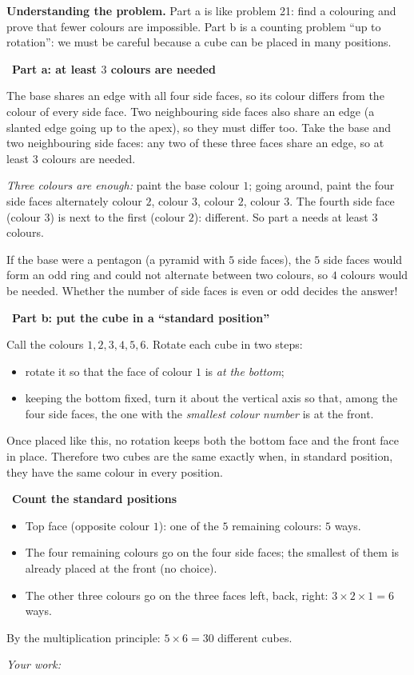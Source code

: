 \documentclass[11pt]{article}
\newif\ifsol \solfalse
\newcommand{\StuProb}[2]{\begin{probboxS}{#1}{#2}\StuProbBody\end{probboxS}}
\newcommand{\probsol}[1]{%
  \begin{lrbox}{\solmeasure}\begin{minipage}{\dimexpr\linewidth-24pt\relax}#1\end{minipage}\end{lrbox}%
  \ifsol
    \begin{solbox}#1\end{solbox}%
  \else
    \setlength{\solht}{\dimexpr\ht\solmeasure+\dp\solmeasure+0.85cm\relax}%
    \ifdim\solht<1.35cm\setlength{\solht}{1.35cm}\fi
    \ifdim\solht>\StudentMaxWork\setlength{\solht}{\StudentMaxWork}\fi
    \par\noindent\begin{minipage}{\linewidth}%
    \expandafter\StuProb\StuProbArgs
    \begin{tcolorbox}[colback=white,colframe=Line,boxrule=0.8pt,arc=5pt,
      left=8pt,right=8pt,top=4pt,bottom=4pt,height=\solht]{\footnotesize\color{Slate}\itshape\WorkWord}\end{tcolorbox}%
    \end{minipage}\par\medskip
  \fi}
\newlength{\StudentMaxWork}\setlength{\StudentMaxWork}{4.5cm}
\newcommand{\step}[2]{\par\smallskip\noindent{\bfseries\color{tmBlue!85!black}\StepWord~#1.}\ {\bfseries #2}\par\nopagebreak}
\def\WorkWord{Your work:}
\def\StepWord{Step}
\begin{document}
\probsol{
\textbf{Understanding the problem.} Part a is like problem 21: find a colouring and prove that fewer colours are impossible. Part b is a
counting problem ``up to rotation'': we must be careful because a cube can be placed in many positions.

\step{1}{Part a: at least $3$ colours are needed}
\begin{proofbox}The base shares an edge with all four side faces, so its colour differs from the colour of every side face. Two neighbouring
side faces also share an edge (a slanted edge going up to the apex), so they must differ too. Take the base and two neighbouring side faces:
any two of these three faces share an edge, so at least $3$ colours are needed.\end{proofbox}
\emph{Three colours are enough:} paint the base colour $1$; going around, paint the four side faces alternately colour $2$, colour $3$,
colour $2$, colour $3$. The fourth side face (colour $3$) is next to the first (colour $2$): different. So part a needs at least $3$ colours.
\begin{tipbox}If the base were a pentagon (a pyramid with $5$ side faces), the $5$ side faces would form an odd ring and could not alternate
between two colours, so $4$ colours would be needed. Whether the number of side faces is even or odd decides the answer!\end{tipbox}

\step{2}{Part b: put the cube in a ``standard position''}
Call the colours $1,2,3,4,5,6$. Rotate each cube in two steps:
\begin{itemize}[leftmargin=1.2em,itemsep=1pt,topsep=2pt]
\item rotate it so that the face of colour $1$ is \emph{at the bottom};
\item keeping the bottom fixed, turn it about the vertical axis so that, among the four side faces, the one with the \emph{smallest colour
number} is at the front.
\end{itemize}
Once placed like this, no rotation keeps both the bottom face and the front face in place. Therefore two cubes are the same exactly when,
in standard position, they have the same colour in every position.

\step{3}{Count the standard positions}
\begin{itemize}[leftmargin=1.2em,itemsep=1pt,topsep=2pt]
\item Top face (opposite colour $1$): one of the $5$ remaining colours: $5$ ways.
\item The four remaining colours go on the four side faces; the smallest of them is already placed at the front (no choice).
\item The other three colours go on the three faces left, back, right: $3\times2\times1=6$ ways.
\end{itemize}
By the multiplication principle: $5\times6=30$ different cubes.

}
\end{document}

